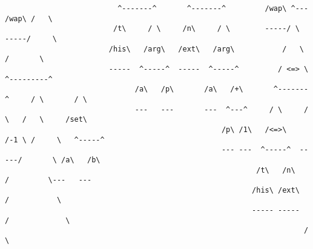 \documentclass[aip,jcp,reprint,footinbib]{revtex4-1}
\begin{document}
\begin{lstlisting}
                          ^-------^       ^-------^         /wap\ ^---    /wap\ /   \
                         /t\     / \     /n\     / \        -----/ \      -----/     \
                        /his\   /arg\   /ext\   /arg\           /   \         /       \
                        -----  ^-----^  -----  ^-----^         / <=> \       ^---------^
                              /a\   /p\       /a\   /+\       ^-------^     / \       / \
                              ---   ---       ---  ^---^     / \     / \   /   \     /set\
                                                  /p\ /1\   /<=>\   /-1 \ /     \   ^-----^
                                                  --- ---  ^-----^  -----/       \ /a\   /b\
                                                          /t\   /n\     /         \---   ---
                                                         /his\ /ext\   /           \
                                                         ----- -----  /             \
                                                                     /               \
\end{lstlisting}
\end{document}

